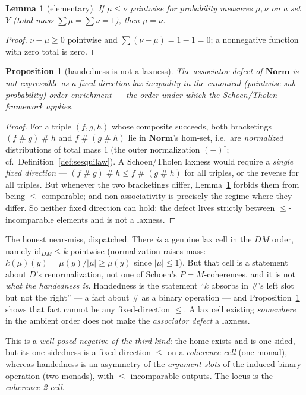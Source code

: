 \documentclass[11pt]{amsart}
\theoremstyle{plain}
\newtheorem{proposition}[theorem]{Proposition}
\newtheorem{lemma}[theorem]{Lemma}
\theoremstyle{definition}
\theoremstyle{remark}
\newcommand{\Norm}{\mathbf{Norm}}
\newcommand{\id}{\mathrm{id}}
\newcommand{\sh}{\mathbin{\#}}
\begin{document}
\begin{lemma}[elementary]
\label{lem:incomparable}
If $\mu\le\nu$ pointwise for probability measures $\mu,\nu$ on a set $Y$ (total mass
$\sum\mu=\sum\nu=1$), then $\mu=\nu$.
\end{lemma}
\begin{proof}
$\nu-\mu\ge 0$ pointwise and $\sum(\nu-\mu)=1-1=0$; a nonnegative function with zero total is zero.
\end{proof}

\begin{proposition}[handedness is not a laxness]
\label{prop:not-lax}
The associator defect of $\Norm$ is not expressible as a fixed-direction lax inequality in the
canonical (pointwise sub-probability) order-enrichment --- the order under which the Schoen/Tholen
framework applies.
\end{proposition}
\begin{proof}
For a triple $(f,g,h)$ whose composite succeeds, both bracketings $(f\sh g)\sh h$ and $f\sh(g\sh h)$
lie in $\Norm$'s hom-set, i.e.\ are \emph{normalized} distributions of total mass $1$ (the outer
normalization $(-)^{\circ}$; cf.\ Definition~\ref{def:sesquilaw}). A Schoen/Tholen laxness would
require a \emph{single fixed direction} --- $(f\sh g)\sh h\le f\sh(g\sh h)$ for all triples, or the
reverse for all triples. But whenever the two bracketings differ, Lemma~\ref{lem:incomparable}
forbids them from being $\le$-comparable; and non-associativity is precisely the regime where they
differ. So neither fixed direction can hold: the defect lives strictly between $\le$-incomparable
elements and is not a laxness.
\end{proof}

The honest near-miss, dispatched. There \emph{is} a genuine lax cell in the $DM$ order, namely
$\id_{DM}\le k$ pointwise (normalization raises mass: $k(\mu)(y)=\mu(y)/|\mu|\ge\mu(y)$ since
$|\mu|\le 1$). But that cell is a statement about $D$'s renormalization, not one of Schoen's
$P=M$-coherences, and it is not \emph{what the handedness is}. Handedness is the statement ``$k$
absorbs in $\sh$'s left slot but not the right'' --- a fact about $\sh$ as a binary operation ---
and Proposition~\ref{prop:not-lax} shows that fact cannot be any fixed-direction $\le$. A lax cell
existing \emph{somewhere} in the ambient order does not make the \emph{associator defect} a laxness.

This is a \emph{well-posed negative of the third kind}: the home exists and is one-sided, but its
one-sidedness is a fixed-direction $\le$ on a \emph{coherence cell} (one monad), whereas handedness
is an asymmetry of the \emph{argument slots} of the induced binary operation (two monads), with
$\le$-incomparable outputs. The locus is the \emph{coherence 2-cell}.
\end{document}
